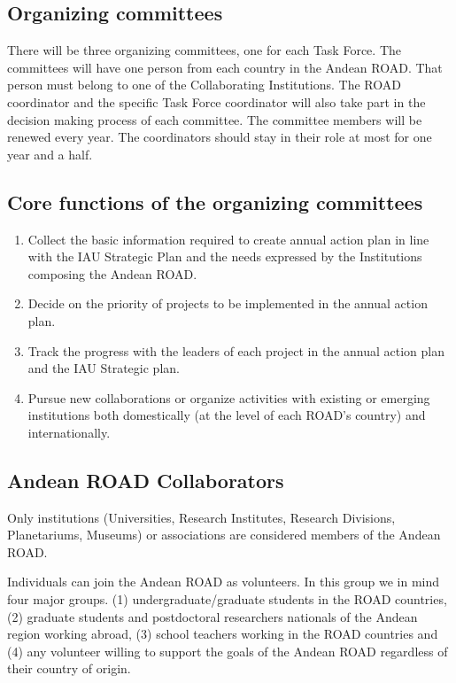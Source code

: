 \documentclass[12pt]{article}
\begin{document}
\subsection*{Organizing committees}


There will be three organizing committees, one for each Task
Force. The committees will have one person from each country in the
Andean ROAD. That person must belong to one of the Collaborating
Institutions. The ROAD coordinator and the specific Task Force
coordinator will also take part in the decision making process of each
committee. The committee members will be renewed every year. The
coordinators should stay in their role at most for one year and a
half. 

\subsection*{Core functions of the organizing committees}
\begin{enumerate}
\item Collect the basic information required to create annual action
  plan in line with the IAU Strategic Plan and the needs expressed by
  the Institutions composing the Andean ROAD. 
\item Decide on the priority of projects to be implemented in the
  annual action plan. 
\item Track the progress with the leaders of each project in the
  annual action plan and the IAU Strategic plan. 
\item Pursue new collaborations or organize activities with existing
  or emerging institutions both domestically (at the level of each
  ROAD’s country) and internationally. 
 \end{enumerate}

\subsection*{Andean ROAD Collaborators}


Only institutions (Universities, Research Institutes, Research
Divisions, Planetariums, Museums) or associations are considered
members of the Andean ROAD. 


Individuals can join the Andean ROAD as volunteers. In this group we
in mind four major groups. (1) undergraduate/graduate students in the
ROAD countries, (2) graduate students and postdoctoral researchers
nationals of the Andean region working abroad, (3) school teachers
working in the ROAD countries and (4) any volunteer willing to support
the goals of the Andean ROAD regardless of their country of origin. 
\end{document}
